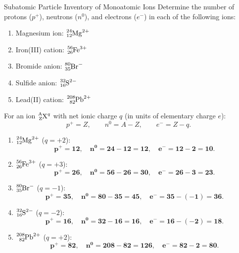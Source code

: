 \begin{exercise}{Subatomic Particle Inventory of Monoatomic Ions}
Determine the number of protons ($p^+$), neutrons ($n^0$), and electrons ($e^-$) in each of the following ions:
\begin{enumerate}[leftmargin=1.5em,itemsep=2pt]
  \item Magnesium ion: $\ce{^{24}_{12}Mg^{2+}}$
  \item Iron(III) cation: $\ce{^{56}_{26}Fe^{3+}}$
  \item Bromide anion: $\ce{^{80}_{35}Br^{-}}$
  \item Sulfide anion: $\ce{^{32}_{16}S^{2-}}$
  \item Lead(II) cation: $\ce{^{208}_{82}Pb^{2+}}$
\end{enumerate}
\end{exercise}

\begin{tabletworkspace}[5.0cm]
\end{tabletworkspace}

\begin{solution}
For an ion $\ce{^{A}_{Z}X^{q}}$ with net ionic charge $q$ (in units of elementary charge $e$):
\[
p^+ = Z, \qquad n^0 = A - Z, \qquad e^- = Z - q.
\]
\begin{enumerate}[leftmargin=1.5em,itemsep=2pt]
  \item $\ce{^{24}_{12}Mg^{2+}}$ ($q = +2$):
  \[
  \mathbf{p^+ = 12}, \quad \mathbf{n^0 = 24 - 12 = 12}, \quad \mathbf{e^- = 12 - 2 = 10}.
  \]
  \item $\ce{^{56}_{26}Fe^{3+}}$ ($q = +3$):
  \[
  \mathbf{p^+ = 26}, \quad \mathbf{n^0 = 56 - 26 = 30}, \quad \mathbf{e^- = 26 - 3 = 23}.
  \]
  \item $\ce{^{80}_{35}Br^{-}}$ ($q = -1$):
  \[
  \mathbf{p^+ = 35}, \quad \mathbf{n^0 = 80 - 35 = 45}, \quad \mathbf{e^- = 35 - (-1) = 36}.
  \]
  \item $\ce{^{32}_{16}S^{2-}}$ ($q = -2$):
  \[
  \mathbf{p^+ = 16}, \quad \mathbf{n^0 = 32 - 16 = 16}, \quad \mathbf{e^- = 16 - (-2) = 18}.
  \]
  \item $\ce{^{208}_{82}Pb^{2+}}$ ($q = +2$):
  \[
  \mathbf{p^+ = 82}, \quad \mathbf{n^0 = 208 - 82 = 126}, \quad \mathbf{e^- = 82 - 2 = 80}.
  \]
\end{enumerate}
\end{solution}

